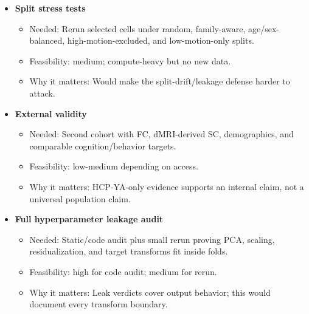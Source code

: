\begin{itemize}
  \begin{itemize}
  \tightlist
  \item
    Needed: Per-edge predictions plus distance, network labels, reliability, and streamline-strength bins.
  \item
    Feasibility: medium with saved matrices and atlas metadata.
  \item
    Why it matters: Could show whether useful signal is concentrated in short/long, intra/inter-network, or high-reliability edges.
  \end{itemize}
\item
  \textbf{Split stress tests}

  \begin{itemize}
  \tightlist
  \item
    Needed: Rerun selected cells under random, family-aware, age/sex-balanced, high-motion-excluded, and low-motion-only splits.
  \item
    Feasibility: medium; compute-heavy but no new data.
  \item
    Why it matters: Would make the split-drift/leakage defense harder to attack.
  \end{itemize}
\item
  \textbf{External validity}

  \begin{itemize}
  \tightlist
  \item
    Needed: Second cohort with FC, dMRI-derived SC, demographics, and comparable cognition/behavior targets.
  \item
    Feasibility: low-medium depending on access.
  \item
    Why it matters: HCP-YA-only evidence supports an internal claim, not a universal population claim.
  \end{itemize}
\item
  \textbf{Full hyperparameter leakage audit}

  \begin{itemize}
  \tightlist
  \item
    Needed: Static/code audit plus small rerun proving PCA, scaling, residualization, and target transforms fit inside folds.
  \item
    Feasibility: high for code audit; medium for rerun.
  \item
    Why it matters: Leak verdicts cover output behavior; this would document every transform boundary.
  \end{itemize}
\end{itemize}

